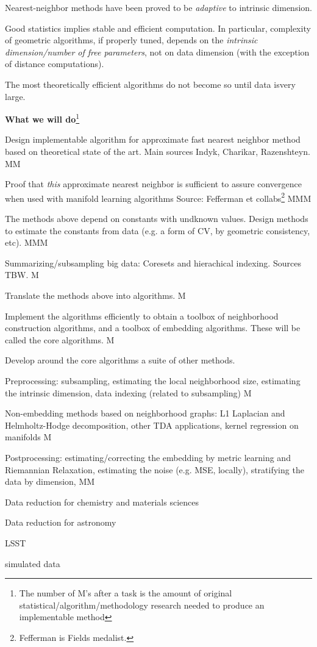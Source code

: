 \documentclass[floatfix,11pt]{revtex4}
\begin{document}
\item Nearest-neighbor methods have been proved to be {\em adaptive} to intrinsic dimension.
\item Good statistics implies stable and efficient computation. In particular, complexity of geometric algorithms, if properly tuned, depends on the {\em intrinsic dimension/number of free parameters}, not on data dimension (with the exception of distance computations). 
\item The most theoretically efficient algorithms do not become so until data isvery large.
\eit

{\bf What we will do}\footnote{The number of M's after a task is the amount of original statistical/algorithm/methodology research needed to produce an implementable method}
\bit
\item Design implementable algorithm for approximate fast nearest neighbor method based on theoretical state of the art. Main sources Indyk, Charikar, Razenshteyn. MM
\item Proof that {\em this} approximate nearest neighbor is sufficient to assure convergence when used with manifold learning algorithms Source: Fefferman et collabs\footnote{Fefferman is Fields medalist.} MMM
\item The methods above depend on constants with undknown values. Design methods to estimate the constants from data (e.g. a form of CV, by geometric consistency, etc). MMM
\item Summarizing/subsampling big data: Coresets and hierachical indexing. Sources TBW. M 
\item Translate the methods above into algorithms. M
\item Implement the algorithms efficiently to obtain a toolbox of neighborhood construction algorithms, and a toolbox of embedding algorithms. These will be called the core algorithms. M
\item Develop around the core algorithms a suite of other methods.
 \bit
 \item Preprocessing: subsampling, estimating the local neighborhood size, estimating the intrinsic dimension, data indexing (related to subsampling) M
 \item Non-embedding methods based on neighborhood graphs: L1 Laplacian and Helmholtz-Hodge decomposition, other TDA applications, kernel regression on manifolds M
 \item Postprocessing: estimating/correcting the embedding by metric learning and Riemannian Relaxation, estimating the noise (e.g. MSE, locally), stratifying the data by dimension, MM
   \eit
 \item Data reduction for chemistry and materials sciences
 \item Data reduction for astronomy 
   \bit
 \item LSST
 \item simulated data
   \eit
 \eit
\end{document}
